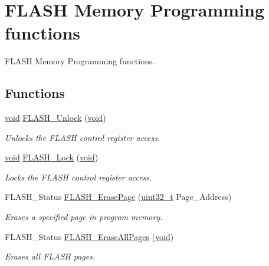 \hypertarget{group___f_l_a_s_h___group2}{\section{F\-L\-A\-S\-H Memory Programming functions}
\label{group___f_l_a_s_h___group2}
}


F\-L\-A\-S\-H Memory Programming functions.  


\subsection*{Functions}
\begin{DoxyCompactItemize}
\item 
\hyperlink{group___n_a_m_e_ga18028b8badbf1ea7e704ccac3c488e82}{void} \hyperlink{group___f_l_a_s_h___group2_ga4084d0184bab463a1579271bf474aaef}{F\-L\-A\-S\-H\-\_\-\-Unlock} (\hyperlink{group___n_a_m_e_ga18028b8badbf1ea7e704ccac3c488e82}{void})
\begin{DoxyCompactList}\small\item\em Unlocks the F\-L\-A\-S\-H control register access. \end{DoxyCompactList}\item 
\hyperlink{group___n_a_m_e_ga18028b8badbf1ea7e704ccac3c488e82}{void} \hyperlink{group___f_l_a_s_h___group2_ga46899557353c4312ddbe3f25e65df1d8}{F\-L\-A\-S\-H\-\_\-\-Lock} (\hyperlink{group___n_a_m_e_ga18028b8badbf1ea7e704ccac3c488e82}{void})
\begin{DoxyCompactList}\small\item\em Locks the F\-L\-A\-S\-H control register access. \end{DoxyCompactList}\item 
F\-L\-A\-S\-H\-\_\-\-Status \hyperlink{group___f_l_a_s_h___group2_ga13a2ca18bfb3d5fb827a2751799f8451}{F\-L\-A\-S\-H\-\_\-\-Erase\-Page} (\hyperlink{stdint_8h_a435d1572bf3f880d55459d9805097f62}{uint32\-\_\-t} Page\-\_\-\-Address)
\begin{DoxyCompactList}\small\item\em Erases a specified page in program memory. \end{DoxyCompactList}\item 
F\-L\-A\-S\-H\-\_\-\-Status \hyperlink{group___f_l_a_s_h___group2_gab2e6dea62c72b3e47c17512579d37498}{F\-L\-A\-S\-H\-\_\-\-Erase\-All\-Pages} (\hyperlink{group___n_a_m_e_ga18028b8badbf1ea7e704ccac3c488e82}{void})
\begin{DoxyCompactList}\small\item\em Erases all F\-L\-A\-S\-H pages. \end{DoxyCompactList}\item 

\end{DoxyCompactItemize}
